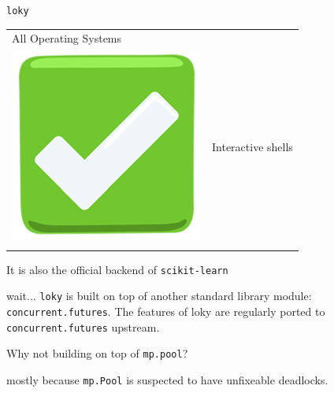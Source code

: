 \documentclass[13pt, usenames,dvipsnames]{beamer} %
\newcommand{\mycode}[2][\tiny] {\texttt{#2}}
\begin{document}
\begin{frame}[t]{\mycode[\small]{loky}}
\begin{tabular}{m{0.5cm} m{10cm}}
            All Operating Systems \\
            \includegraphics[width=\linewidth] {media/green-tick-emoji.png} &
            Interactive shells\\
            & \\
        \end{tabular}
        \vspace{1em}
        It is also the official backend of \mycode{scikit-learn}

    \end{frame}

    \begin{frame}[fragile]{wait...}
        \mycode{loky} is built on top of another standard library module:
        \mycode{concurrent.futures}. The features of loky are regularly ported
        to \mycode{concurrent.futures} upstream.

        \begin{flushright}
            Why not building on top of \mycode{mp.pool}?
        \end{flushright}
        mostly because \mycode{mp.Pool} is suspected to have unfixeable deadlocks.

    \end{frame}
\end{document}
